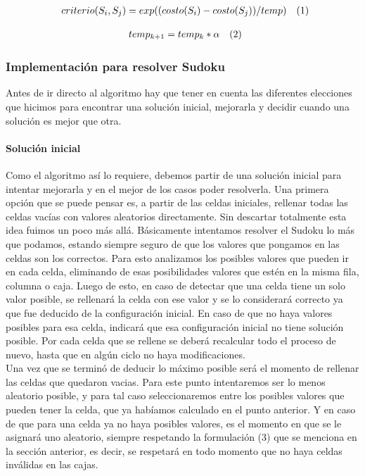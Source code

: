 \begin{equation*}
\begin{array}{ll@{}ll}
criterio(S_{i}, S_{j})= exp( (costo(S_{i}) - costo(S_{j})) / temp) & (1) 
\end{array}
\end{equation*}

\begin{equation*}
\begin{array}{ll@{}ll}
temp_{k+1} =  temp_{k} *  \alpha & (2)
\end{array}
\end{equation*}


\subsubsection{Implementación para resolver Sudoku}
Antes de ir directo al algoritmo hay que tener en cuenta las diferentes elecciones que hicimos para encontrar una solución inicial, mejorarla y  decidir cuando una solución es mejor que otra.
\paragraph{Solución inicial} 
Como el algoritmo así lo requiere, debemos partir de una solución inicial para intentar mejorarla y en el mejor de los casos poder resolverla. Una primera opción que se puede pensar es, a partir de las celdas iniciales, rellenar todas las celdas vacías con valores aleatorios directamente. Sin descartar totalmente esta idea fuimos un poco más allá. Básicamente intentamos resolver el Sudoku lo más que podamos, estando siempre seguro de que los valores que pongamos en las celdas son los correctos. Para esto analizamos los posibles valores que pueden ir en cada celda, eliminando de esas posibilidades valores que estén en la misma fila, columna o caja. Luego de esto, en caso de detectar que una celda tiene un solo valor posible, se rellenará la celda con ese valor y se lo considerará correcto ya que fue deducido de la configuración inicial. En caso de que no haya valores posibles para esa celda, indicará que esa configuración inicial no tiene solución posible. Por cada celda que se rellene se deberá recalcular todo el proceso de nuevo, hasta que en algún ciclo no haya modificaciones. \\Una vez que se terminó de deducir lo máximo posible será el momento de rellenar las celdas que quedaron vacias. Para este punto intentaremos ser lo menos aleatorio posible, y para tal caso seleccionaremos entre los posibles valores que pueden tener la celda, que ya habíamos calculado en el punto anterior. Y en caso de que para una celda ya no haya posibles valores, es el momento en que se le asignará uno aleatorio, siempre respetando la formulación (3) que se menciona en la sección anterior, es decir, se respetará en todo momento que no haya celdas inválidas en las cajas.\\

